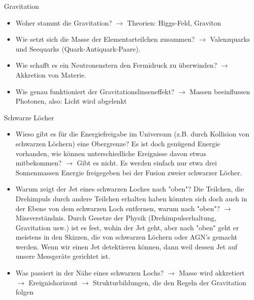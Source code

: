 \begin{frame}{Gravitation}
\begin{itemize}
  \setlength\itemsep{2em}
  \item Woher stammt die Gravitation?
  $\longrightarrow$ Theorien: Higgs-Feld, Graviton
  \item Wie setzt sich die Masse der Elementarteilchen zusammen?
  $\longrightarrow$ Valenzquarks und Seequarks (Quark-Antiquark-Paare).
  \item Wie schafft es ein Neutronenstern den Fermidruck zu überwinden?
  $\longrightarrow$ Akkretion von Materie.
  \item Wie genau funktioniert der Gravitationslinseneffekt?
  $\longrightarrow$ Massen beeinflussen Photonen, also: Licht wird abgelenkt
\end{itemize}
\end{frame}

\begin{frame}{Schwarze Löcher}
  \begin{itemize}
    \setlength\itemsep{2em}
    \item Wieso gibt es für die Energiefreigabe im Universum (z.B. durch
    Kollision von schwarzen Löchern) eine Obergrenze? Es ist doch genügend
    Energie vorhanden, wie können unterschiedliche Ereignisse davon etwas
    mitbekommen?
   $\longrightarrow$ Gibt es nicht. Es werden einfach nur etwa drei Sonnenmassen
   Energie freigegeben bei der Fusion zweier schwarzer Löcher.
   \item Warum zeigt der Jet eines schwarzen Loches nach "oben"?
   Die Teilchen, die Drehimpuls durch andere Teilchen erhalten
   haben könnten sich doch auch in der Ebene von dem schwarzen Loch entfernen,
   warum nach "oben"?
   $\longrightarrow$ Missverständnis. Durch Gesetze der Physik
   (Drehimpulserhaltung, Gravitation usw.) ist es fest, wohin der Jet geht, aber
   nach "oben" geht er meistens in den Skizzen, die von schwarzen Löchern oder
   AGN's gemacht werden. Wenn wir einen Jet detektieren können, dann weil dessen
   Jet auf unsere Messgeräte gerichtet ist.
   \item Was passiert in der Nähe eines schwarzen Lochs?
   $\longrightarrow$ Masse wird akkretiert
   $\longrightarrow$ Ereignishorizont
   $\longrightarrow$ Strukturbildungen, die den Regeln der Gravitation folgen
\end{itemize}

\end{frame}

